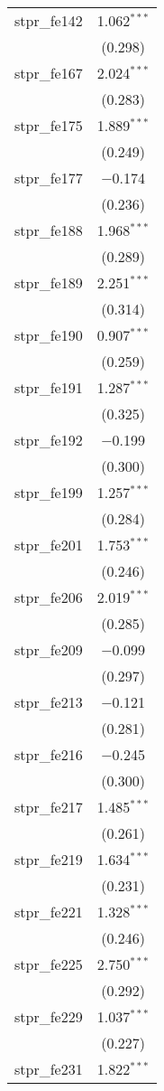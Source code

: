 \begin{table}[!htbp]
\begin{tabular}{@{\extracolsep{5pt}}lc}
  stpr\_fe142 & 1.062$^{***}$ \\ 
  & (0.298) \\ 
  stpr\_fe167 & 2.024$^{***}$ \\ 
  & (0.283) \\ 
  stpr\_fe175 & 1.889$^{***}$ \\ 
  & (0.249) \\ 
  stpr\_fe177 & $-$0.174 \\ 
  & (0.236) \\ 
  stpr\_fe188 & 1.968$^{***}$ \\ 
  & (0.289) \\ 
  stpr\_fe189 & 2.251$^{***}$ \\ 
  & (0.314) \\ 
  stpr\_fe190 & 0.907$^{***}$ \\ 
  & (0.259) \\ 
  stpr\_fe191 & 1.287$^{***}$ \\ 
  & (0.325) \\ 
  stpr\_fe192 & $-$0.199 \\ 
  & (0.300) \\ 
  stpr\_fe199 & 1.257$^{***}$ \\ 
  & (0.284) \\ 
  stpr\_fe201 & 1.753$^{***}$ \\ 
  & (0.246) \\ 
  stpr\_fe206 & 2.019$^{***}$ \\ 
  & (0.285) \\ 
  stpr\_fe209 & $-$0.099 \\ 
  & (0.297) \\ 
  stpr\_fe213 & $-$0.121 \\ 
  & (0.281) \\ 
  stpr\_fe216 & $-$0.245 \\ 
  & (0.300) \\ 
  stpr\_fe217 & 1.485$^{***}$ \\ 
  & (0.261) \\ 
  stpr\_fe219 & 1.634$^{***}$ \\ 
  & (0.231) \\ 
  stpr\_fe221 & 1.328$^{***}$ \\ 
  & (0.246) \\ 
  stpr\_fe225 & 2.750$^{***}$ \\ 
  & (0.292) \\ 
  stpr\_fe229 & 1.037$^{***}$ \\ 
  & (0.227) \\ 
  stpr\_fe231 & 1.822$^{***}$ \\ 

\end{tabular}
\end{table}
